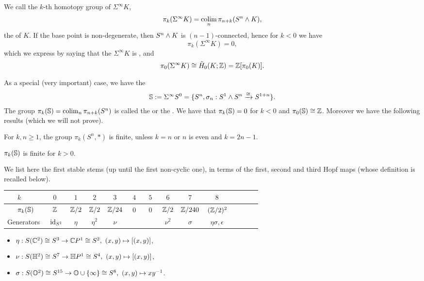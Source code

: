 We call the $k$-th homotopy group of $\Sigma^\infty K$, \[\pi_k(\Sigma^\infty K)=\operatorname*{colim}_n \pi_{n+k}(S^n\wedge K),\] the  of $K$. If the base point is non-degenerate, then $S^n\wedge K$ is $(n-1)$-connected, hence for $k<0$ we have
\[\pi_k(\Sigma^\infty K)=0,\]
which we express by saying that the $\Sigma^\infty K$ is , and
\[\pi_0(\Sigma^\infty K)\cong\tilde H_0(K;{\mathbb Z})={\mathbb Z}[\pi_0(K)].\]

As a special (very important) case, we have the 
\[\mathbb{S}:=\Sigma^\infty S^0=\{S^n,\sigma_n:S^1\wedge S^n\xrightarrow{\cong}S^{1+n}\}.\]
The group $\pi_k(\mathbb{S})=\operatorname*{colim}_n\pi_{n+k}(S^n)$ is called the  or the . We have that $\pi_k(\mathbb{S})=0$ for $k<0$ and $\pi_0(\mathbb{S})\cong{\mathbb Z}$. Moreover we have the following results (which we will not prove).

\begin{theorem**}[Serre]
For $k,n\geq1$, the group $\pi_k(S^n,*)$ is finite, unless $k=n$ or $n$ is even and $k=2n-1$.
\end{theorem**}

\begin{corollary**}
$\pi_k(\mathbb{S})$ is finite for $k>0$.
\end{corollary**}
 
We list here the first stable stems (up until the first non-cyclic one), in terms of the first, second and third Hopf maps (whose definition is recalled below).

{\setlength{\tabcolsep}{8pt}
\begin{center}
\begin{tabular}{l*{12}{c}r}
$\ \ \ \ \ \ \,k$ & $0$ & $1$ & $2$ & $3$ & $4$  & $5$ & $6$ & $7$ & $8$\\
\hline
$\ \ \ \ \,\pi_k(\SS)$ & ${\mathbb Z}$ & ${\mathbb Z}/2$ & ${\mathbb Z}/2$ & ${\mathbb Z}/24$ &  $\ \ 0\ \ $ & $\ \ 0\ \ $  & ${\mathbb Z}/2$ & ${\mathbb Z}/240$ & $\,({\mathbb Z}/2)^2$ \\
Generators & $\ \,\id_{S^1}$ & $\eta$ & $\eta^2$ & $\nu$ &  &  & $\nu^2$ & $\sigma$ & $\eta \sigma, \epsilon$  \\
\end{tabular}
\end{center}}

\begin{itemize}
\item $\eta:S(\mathbb{C}^2) \cong S^3 \to \mathbb{C} P^1 \cong S^2,\ (x,y)\mapsto[(x,y)]$,
\item $\nu:S(\mathbb{H}^2) \cong S^7 \to \mathbb{H} P^1 \cong S^4,\ (x,y)\mapsto[(x,y)]$,
\item $\sigma:S(\mathbb{O}^2) \cong S^{15} \to \mathbb{O} \cup \{\infty \} \cong S^8, \ (x,y) \mapsto xy^{-1}$.
\end{itemize}
